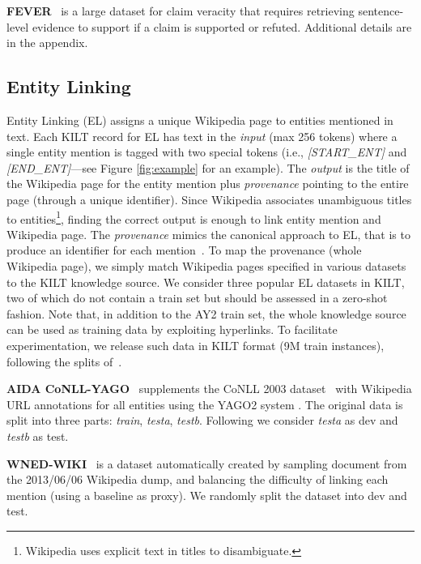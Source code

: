 \documentclass[11pt]{article}
\begin{document}
\textbf{FEVER}~\cite{Thorne18Fever} is a large dataset for claim veracity that requires retrieving sentence-level evidence to support if a claim is supported or refuted. Additional details are in the appendix.








\subsection{Entity Linking}

Entity Linking (EL) assigns a unique Wikipedia page to entities mentioned in text. Each KILT record for EL has text in the \textit{input} (max 256 tokens) where a single entity mention is tagged with two special tokens (i.e., \textit{[START\_ENT]} and \textit{[END\_ENT]}---see Figure \ref{fig:example} for an example). The \textit{output} is the title of the Wikipedia page for the entity mention plus \textit{provenance} pointing to the entire page (through a unique identifier). Since Wikipedia associates unambiguous titles to entities\footnote{Wikipedia uses explicit text in titles to disambiguate.}, finding the correct output is enough to link entity mention and Wikipedia page. The \textit{provenance} mimics the canonical approach to EL, that is to produce an identifier for each mention~\cite{wu2019zero}.
To map the provenance (whole Wikipedia page), we simply match Wikipedia pages specified in  various datasets to the KILT knowledge source.  
We consider three popular EL datasets in KILT, two of which do not contain a train set but should be assessed in a zero-shot fashion. Note that, in addition to the AY2 train set, the whole knowledge source can be used as training data by exploiting hyperlinks. To facilitate experimentation, we release such data in KILT format (9M train instances), following the splits of~\citet{wu2019zero}.

\textbf{AIDA CoNLL-YAGO}~\cite{hoffart2011robust} supplements the CoNLL 2003 dataset~\cite{sang2003introduction} with Wikipedia URL annotations for all entities using the YAGO2 system \cite{hoffart2011yago2}. The original data is split into three parts: \textit{train}, \textit{testa}, \textit{testb}. Following \citet{hoffart2011robust} we consider \textit{testa} as dev and \textit{testb} as test.

\textbf{WNED-WIKI}~\cite{guo2018robust} is a dataset automatically created by sampling document from the 2013/06/06 Wikipedia dump, and balancing the difficulty of linking each mention (using a baseline as proxy). We randomly split the dataset into dev and test.
\end{document}
